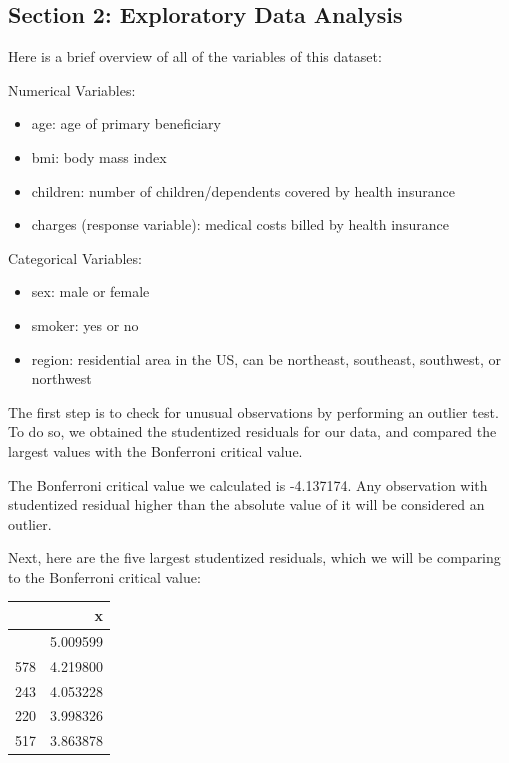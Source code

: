 \documentclass[
  12pt,
]{article}
\providecommand{\tightlist}{%
  \setlength{\itemsep}{0pt}\setlength{\parskip}{0pt}}
\begin{document}
\newpage

\subsection{Section 2: Exploratory Data
Analysis}\label{section-2-exploratory-data-analysis}

Here is a brief overview of all of the variables of this dataset:

Numerical Variables:

\begin{itemize}
\tightlist
\item
  age: age of primary beneficiary
\item
  bmi: body mass index
\item
  children: number of children/dependents covered by health insurance
\item
  charges (response variable): medical costs billed by health insurance
\end{itemize}

Categorical Variables:

\begin{itemize}
\tightlist
\item
  sex: male or female
\item
  smoker: yes or no
\item
  region: residential area in the US, can be northeast, southeast,
  southwest, or northwest
\end{itemize}

The first step is to check for unusual observations by performing an
outlier test. To do so, we obtained the studentized residuals for our
data, and compared the largest values with the Bonferroni critical
value.

The Bonferroni critical value we calculated is -4.137174. Any
observation with studentized residual higher than the absolute value of
it will be considered an outlier.

Next, here are the five largest studentized residuals, which we will be
comparing to the Bonferroni critical value:

\begin{longtable}[]{@{}lr@{}}
\toprule\noalign{}
& x \\
\midrule\noalign{}
\endhead
\bottomrule\noalign{}
\endlastfoot
1301 & 5.009599 \\
578 & 4.219800 \\
243 & 4.053228 \\
220 & 3.998326 \\
517 & 3.863878 \\
\end{longtable}
\end{document}
